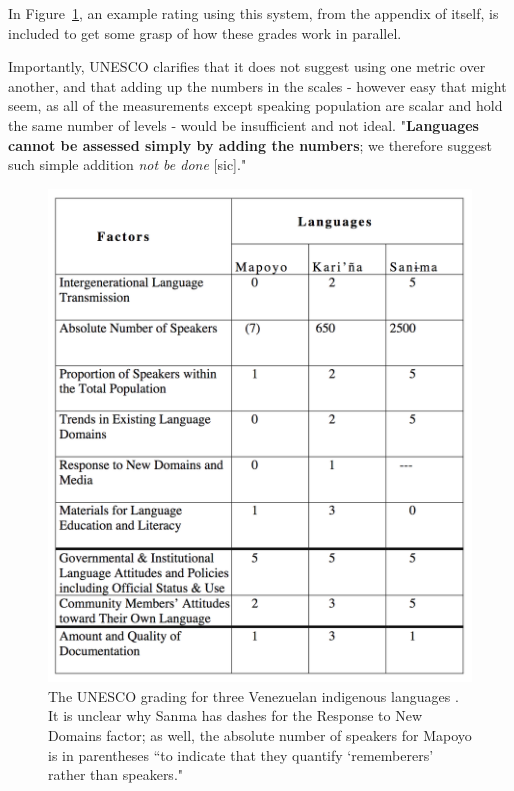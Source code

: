 In Figure~\ref{fig:unesco}, an example rating using this system, from the appendix of \citet{brenzinger2003language} itself, is included to get some grasp of how these grades work in parallel.

Importantly, UNESCO clarifies that it does not suggest using one metric over another, and that adding up the numbers in the scales - however easy that might seem, as all of the measurements except speaking population are scalar and hold the same number of levels - would be insufficient and not ideal. "\textbf{Languages cannot be assessed simply by adding the numbers}; we therefore suggest such simple addition \textit{not be done} [sic]."

\begin{figure}
 \centering
 \includegraphics[width=1\textwidth]{img/unesco.png}
 \caption{The UNESCO grading for three Venezuelan indigenous languages \citep[23]{brenzinger2003language}. It is unclear why Sanma has dashes for the Response to New Domains factor; as well, the absolute number of speakers for Mapoyo is in parentheses ``to indicate that they quantify `rememberers' rather than speakers." \citep[22]{brenzinger2003language}}
 \label{fig:unesco}
\end{figure}

